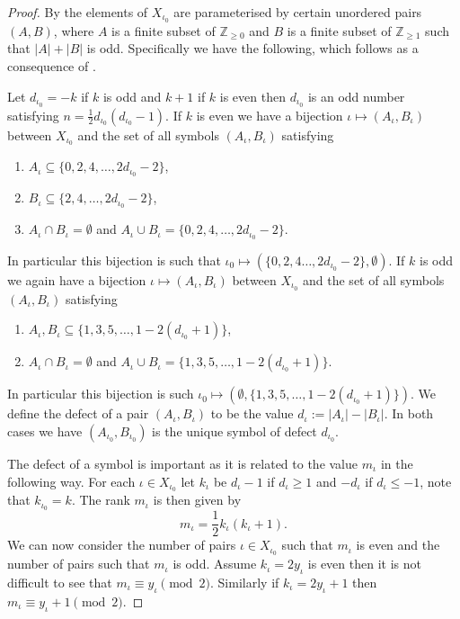 \documentclass{jt-calcs}
\begin{document}
\begin{proof}
By \cite[11.6.1]{lusztig:1984:intersection-cohomology-complexes} the elements of $X_{\iota_0}$ are parameterised by certain unordered pairs $(A,B)$, where $A$ is a finite subset of $\mathbb{Z}_{\geqslant 0}$ and $B$ is a finite subset of $\mathbb{Z}_{\geqslant 1}$ such that $|A| + |B|$ is odd. Specifically we have the following, which follows as a consequence of \cite[Corollary 12.4]{lusztig:1984:intersection-cohomology-complexes}.

Let $d_{\iota_0} = -k$ if $k$ is odd and $k+1$ if $k$ is even then $d_{\iota_0}$ is an odd number satisfying $n = \frac{1}{2}d_{\iota_0}(d_{\iota_0}-1)$. If $k$ is even we have a bijection $\iota \mapsto (A_{\iota},B_{\iota})$ between $X_{\iota_0}$ and the set of all symbols $(A_{\iota},B_{\iota})$ satisfying
\begin{enumerate}
	\item $A_{\iota} \subseteq \{0,2,4,\dots,2d_{\iota_0}-2\}$,
	\item $B_{\iota} \subseteq \{2,4,\dots,2d_{\iota_0}-2\}$,
	\item $A_{\iota} \cap B_{\iota} = \emptyset$ and $A_{\iota} \cup B_{\iota} = \{0,2,4,\dots,2d_{\iota_0}-2\}$.
\end{enumerate}
In particular this bijection is such that $\iota_0 \mapsto (\{0,2,4\dots,2d_{\iota_0}-2\},\emptyset)$. If $k$ is odd we again have a bijection $\iota \mapsto (A_{\iota},B_{\iota})$ between $X_{\iota_0}$ and the set of all symbols $(A_{\iota},B_{\iota})$ satisfying
\begin{enumerate}
	\item $A_{\iota}, B_{\iota} \subseteq \{1,3,5,\dots,1-2(d_{\iota_0}+1)\}$,
	\item $A_{\iota} \cap B_{\iota} = \emptyset$ and $A_{\iota} \cup B_{\iota} = \{1,3,5,\dots,1-2(d_{\iota_0}+1)\}$.
\end{enumerate}
In particular this bijection is such $\iota_0 \mapsto (\emptyset,\{1,3,5,\dots,1-2(d_{\iota_0}+1)\})$. We define the defect of a pair $(A_{\iota},B_{\iota})$ to be the value $d_{\iota} := |A_{\iota}| - |B_{\iota}|$. In both cases we have $(A_{\iota_0},B_{\iota_0})$ is the unique symbol of defect $d_{\iota_0}$.

The defect of a symbol is important as it is related to the value $m_{\iota}$ in the following way. For each $\iota \in X_{\iota_0}$ let $k_{\iota}$ be $d_{\iota}-1$ if $d_{\iota} \geqslant 1$ and $-d_{\iota}$ if $d_{\iota} \leqslant -1$, note that $k_{\iota_0} = k$. The rank $m_{\iota}$ is then given by
\begin{equation*}
m_{\iota} = \frac{1}{2}k_{\iota}(k_{\iota}+1).
\end{equation*}
We can now consider the number of pairs $\iota \in X_{\iota_0}$ such that $m_{\iota}$ is even and the number of pairs such that $m_{\iota}$ is odd. Assume $k_{\iota} = 2y_{\iota}$ is even then it is not difficult to see that $m_{\iota} \equiv y_{\iota} \pmod{2}$. Similarly if $k_{\iota} = 2y_{\iota} + 1$ then $m_{\iota} \equiv y_{\iota} + 1 \pmod{2}$.


\end{proof}
\end{document}
